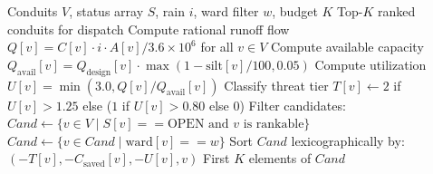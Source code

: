 \begin{algorithm}[h!]
\caption{Cascade-Aware Priority Dispatch and Queue Management}
\label{alg:cascade_dispatch}
\begin{algorithmic}[1]
\REQUIRE Conduits $V$, status array $S$, rain $i$, ward filter $w$, budget $K$
\ENSURE Top-$K$ ranked conduits for dispatch
\STATE Compute rational runoff flow $Q[v] = C[v] \cdot i \cdot A[v] / 3.6\times 10^6$ for all $v \in V$
\STATE Compute available capacity $Q_{\text{avail}}[v] = Q_{\text{design}}[v] \cdot \max(1 - \text{silt}[v]/100, 0.05)$
\STATE Compute utilization $U[v] = \min(3.0, Q[v] / Q_{\text{avail}}[v])$
\STATE Classify threat tier $T[v] \leftarrow 2$ if $U[v] > 1.25$ else ($1$ if $U[v] > 0.80$ else $0$)
\STATE Filter candidates: $Cand \leftarrow \{v \in V \mid S[v] == \text{OPEN} \text{ and } v \text{ is rankable}\}$
    \STATE $Cand \leftarrow \{v \in Cand \mid \text{ward}[v] == w\}$
\ENDIF
\STATE Sort $Cand$ lexicographically by: $(-T[v], -C_{\text{saved}}[v], -U[v], v)$
\RETURN First $K$ elements of $Cand$
\end{algorithmic}
\end{algorithm}
